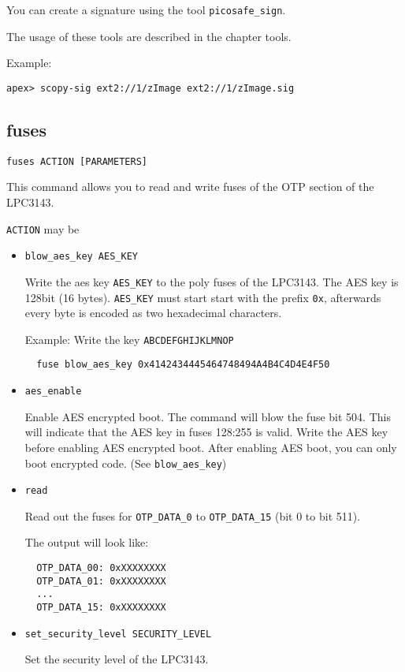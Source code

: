 You can create a signature using the tool \texttt{picosafe\_sign}.

The usage of these tools are described in the chapter tools.

Example:
\begin{lstlisting}
apex> scopy-sig ext2://1/zImage ext2://1/zImage.sig
\end{lstlisting}

\subsection{fuses}
\texttt{fuses ACTION [PARAMETERS]}

This command allows you to read and write fuses of the OTP section of the LPC3143.

\texttt{ACTION} may be
\begin{itemize}
\item \texttt{blow\_aes\_key AES\_KEY}

Write the aes key \texttt{AES\_KEY} to the poly fuses of the LPC3143. The AES
key is 128bit (16 bytes). \texttt{AES\_KEY} must start start with the prefix
\texttt{0x}, afterwards every byte is encoded as two hexadecimal characters.

Example: Write the key \texttt{ABCDEFGHIJKLMNOP}
\begin{lstlisting}
  fuse blow_aes_key 0x4142434445464748494A4B4C4D4E4F50
\end{lstlisting}

\item \texttt{aes\_enable}

Enable AES encrypted boot. The command will blow the fuse bit 504. This will
indicate that the AES key in fuses 128:255 is valid. Write the AES key before
enabling AES encrypted boot. After enabling AES boot, you can only boot
encrypted code. (See \texttt{blow\_aes\_key})

\item \texttt{read}

Read out the fuses for \texttt{OTP\_DATA\_0} to \texttt{OTP\_DATA\_15} (bit 0 to bit 511).

The output will look like:
\begin{lstlisting}
  OTP_DATA_00: 0xXXXXXXXX
  OTP_DATA_01: 0xXXXXXXXX
  ...
  OTP_DATA_15: 0xXXXXXXXX
\end{lstlisting}

\item \texttt{set\_security\_level SECURITY\_LEVEL}

Set the security level of the LPC3143.


\end{itemize}
